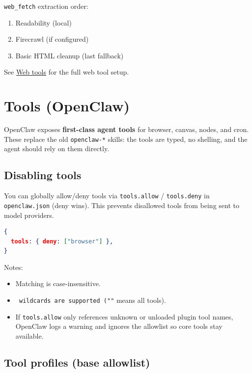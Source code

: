 \texttt{web\_fetch} extraction order:

\begin{enumerate}
  \item Readability (local)
  \item Firecrawl (if configured)
  \item Basic HTML cleanup (last fallback)
\end{enumerate}


See \href{/tools/web}{Web tools} for the full web tool setup.


\clearpage

\section{Tools (OpenClaw)}


OpenClaw exposes \textbf{first-class agent tools} for browser, canvas, nodes, and cron.
These replace the old \texttt{openclaw-*} skills: the tools are typed, no shelling,
and the agent should rely on them directly.

\subsection{Disabling tools}


You can globally allow/deny tools via \texttt{tools.allow} / \texttt{tools.deny} in \texttt{openclaw.json}
(deny wins). This prevents disallowed tools from being sent to model providers.

\begin{lstlisting}[language=json]
{
  tools: { deny: ["browser"] },
}
\end{lstlisting}


Notes:

\begin{itemize}
  \item Matching is case-insensitive.
  \item \texttt{\textit{} wildcards are supported (\texttt{"}"} means all tools).
  \item If \texttt{tools.allow} only references unknown or unloaded plugin tool names, OpenClaw logs a warning and ignores the allowlist so core tools stay available.
\end{itemize}


\subsection{Tool profiles (base allowlist)}


